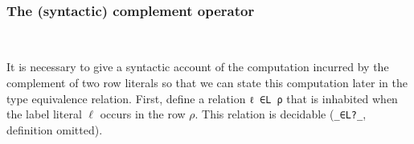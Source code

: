 \documentclass[authoryear, acmsmall, screen, review, nonacm]{acmart}
\begin{document}
\begin{code}
\AgdaSpace{}%
\AgdaSpace{}%
\AgdaSpace{}%
\AgdaSpace{}%
\AgdaSpace{}%
\AgdaSpace{}%
\AgdaSpace{}%
\AgdaOperator{\AgdaInductiveConstructor{R[}}\AgdaSpace{}%
\AgdaSpace{}%
\AgdaOperator{\AgdaInductiveConstructor{]}}\<%
\\
\>[0]\AgdaSpace{}%
\AgdaSpace{}%
\AgdaSpace{}%
\AgdaSymbol{=}\AgdaSpace{}%
\AgdaSpace{}%
\AgdaSpace{}%
\AgdaSpace{}%
\AgdaSpace{}%
\<%
\end{code}

\subsubsection{The (syntactic) complement operator}~

It is necessary to give a syntactic account of the computation incurred by the complement of two row literals so that we can state this computation later in the type equivalence relation. First, define a relation \verb!ℓ ∈L ρ! that is inhabited when the label literal $\ell$ occurs in the row $\rho$. This relation is decidable (\verb!_∈L?_!, definition omitted).
\end{document}
